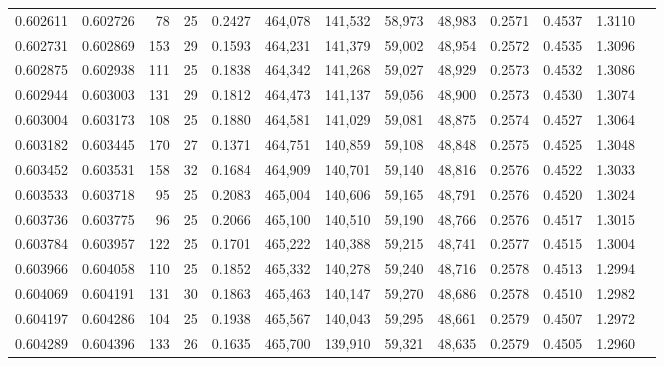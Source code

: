 \begin{tabular}{rrrrrrrrrrrrr}
0.602611 & 0.602726 &    78 &  25 &                                     0.2427 & 464,078 & 141,532 &  58,973 &  48,983 & 0.2571 & 0.4537 & 1.3110 \\
0.602731 & 0.602869 &   153 &  29 &                                     0.1593 & 464,231 & 141,379 &  59,002 &  48,954 & 0.2572 & 0.4535 & 1.3096 \\
0.602875 & 0.602938 &   111 &  25 &                                     0.1838 & 464,342 & 141,268 &  59,027 &  48,929 & 0.2573 & 0.4532 & 1.3086 \\
0.602944 & 0.603003 &   131 &  29 &                                     0.1812 & 464,473 & 141,137 &  59,056 &  48,900 & 0.2573 & 0.4530 & 1.3074 \\
0.603004 & 0.603173 &   108 &  25 &                                     0.1880 & 464,581 & 141,029 &  59,081 &  48,875 & 0.2574 & 0.4527 & 1.3064 \\
0.603182 & 0.603445 &   170 &  27 &                                     0.1371 & 464,751 & 140,859 &  59,108 &  48,848 & 0.2575 & 0.4525 & 1.3048 \\
0.603452 & 0.603531 &   158 &  32 &                                     0.1684 & 464,909 & 140,701 &  59,140 &  48,816 & 0.2576 & 0.4522 & 1.3033 \\
0.603533 & 0.603718 &    95 &  25 &                                     0.2083 & 465,004 & 140,606 &  59,165 &  48,791 & 0.2576 & 0.4520 & 1.3024 \\
0.603736 & 0.603775 &    96 &  25 &                                     0.2066 & 465,100 & 140,510 &  59,190 &  48,766 & 0.2576 & 0.4517 & 1.3015 \\
0.603784 & 0.603957 &   122 &  25 &                                     0.1701 & 465,222 & 140,388 &  59,215 &  48,741 & 0.2577 & 0.4515 & 1.3004 \\
0.603966 & 0.604058 &   110 &  25 &                                     0.1852 & 465,332 & 140,278 &  59,240 &  48,716 & 0.2578 & 0.4513 & 1.2994 \\
0.604069 & 0.604191 &   131 &  30 &                                     0.1863 & 465,463 & 140,147 &  59,270 &  48,686 & 0.2578 & 0.4510 & 1.2982 \\
0.604197 & 0.604286 &   104 &  25 &                                     0.1938 & 465,567 & 140,043 &  59,295 &  48,661 & 0.2579 & 0.4507 & 1.2972 \\
0.604289 & 0.604396 &   133 &  26 &                                     0.1635 & 465,700 & 139,910 &  59,321 &  48,635 & 0.2579 & 0.4505 & 1.2960 \\

\end{tabular}
